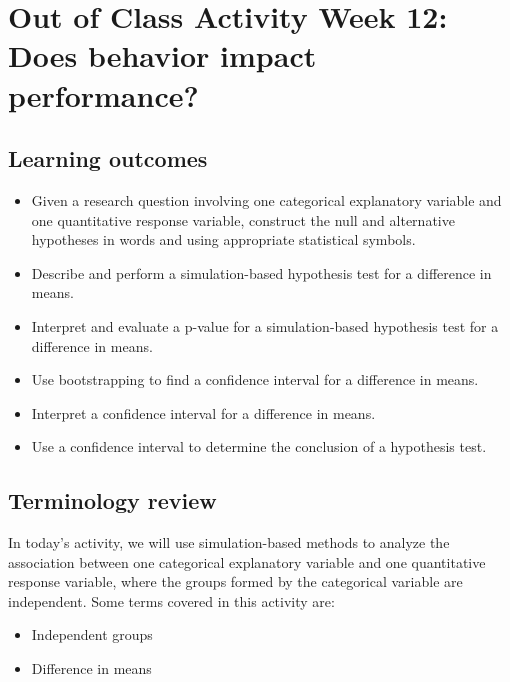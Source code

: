 \documentclass[
]{report}
\begin{document}
\vspace{1in}
\newpage

\hypertarget{out-of-class-activity-week-12-does-behavior-impact-performance}{%
\section{Out of Class Activity Week 12: Does behavior impact performance?}\label{out-of-class-activity-week-12-does-behavior-impact-performance}}


\hypertarget{learning-outcomes-6}{%
\subsection{Learning outcomes}\label{learning-outcomes-6}}

\begin{itemize}
\item
  Given a research question involving one categorical explanatory variable and one quantitative response variable, construct the null and alternative hypotheses
  in words and using appropriate statistical symbols.
\item
  Describe and perform a simulation-based hypothesis test for a difference in means.
\item
  Interpret and evaluate a p-value for a simulation-based hypothesis test for a difference in means.
\item
  Use bootstrapping to find a confidence interval for a difference in means.
\item
  Interpret a confidence interval for a difference in means.
\item
  Use a confidence interval to determine the conclusion of a hypothesis test.
\end{itemize}

\hypertarget{terminology-review-4}{%
\subsection{Terminology review}\label{terminology-review-4}}

In today's activity, we will use simulation-based methods to analyze the association between one categorical explanatory variable and one quantitative response variable, where the groups formed by the categorical variable are independent. Some terms covered in this activity are:

\begin{itemize}
\item
  Independent groups
\item
  Difference in means
\end{itemize}
\end{document}
